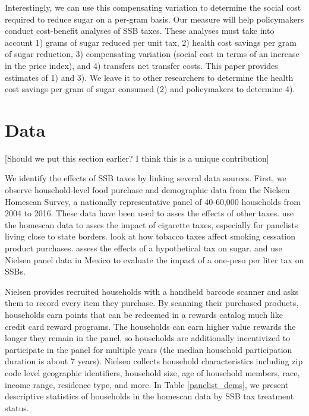 \documentclass[12pt]{article}
\begin{document}
Interestingly, we can use this compensating variation to determine the social cost required to reduce sugar on a per-gram basis. Our measure will help policymakers conduct cost-benefit analyses of SSB taxes. These analyses must take into account 1) grams of sugar reduced per unit tax, 2) health cost savings per gram of sugar reduction, 3) compensating variation (social cost in terms of an increase in the price index), and 4) transfers net transfer costs. This paper provides estimates of 1) and 3). We leave it to other researchers to determine the health cost savings per gram of sugar consumed (2) and policymakers to determine 4).
\section{Data} \label{data}

[Should we put this section earlier? I think this is a unique contribution]

We identify the effects of SSB taxes by linking several data sources. First, we observe household-level food purchase and demographic data from the Nielsen Homescan Survey, a nationally representative panel of 40-60,000 households from 2004 to 2016. These data have been used to asses the effects of other taxes. \textcite{harding2012heterogeneous} use the homescan data to asses the impact of cigarette taxes, especially for panelists living close to state borders. \textcite{cotti2016effects} look at how tobacco taxes affect smoking cessation product purchases. \textcite{dharmasena2012intended} assess the effects of a hypothetical tax on sugar. \textcite{colchero2016beverage} and \textcite{colchero2017mexico} use Nielsen panel data in Mexico to evaluate the impact of a one-peso per liter tax on SSBs.

Nielsen provides recruited households with a handheld barcode scanner and asks them to record every item they purchase. By scanning their purchased products, households earn points that can be redeemed in a rewards catalog much like credit card reward programs. The households can earn higher value rewards the longer they remain in the panel, so households are additionally incentivized to participate in the panel for multiple years (the median household participation duration is about 7 years). Nielsen collects household characteristics including zip code level geographic identifiers, household size, age of household members, race, income range, residence type, and more. In Table \ref{panelist_dems}, we present descriptive statistics of households in the homescan data by SSB tax treatment status.
\end{document}
